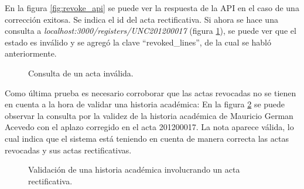 En la figura \ref{fig:revoke_api} se puede ver la respuesta de la API en el caso de una corrección exitosa. Se indica el id del acta rectificativa. Si ahora se hace una consulta a \textit{localhost:3000/registers/UNC201200017} (figura \ref{fig:invalid_register}), se puede ver que el estado es inválido y se agregó la clave ``revoked\_lines'', de la cual se habló anteriormente.
\begin{figure}
    \caption{Consulta de un acta inválida.}
    \label{fig:invalid_register}
\end{figure}

Como última prueba es necesario corroborar que las actas revocadas no se tienen en cuenta a la hora de validar una historia académica: En la figura \ref{fig:history_with_revoked} se puede observar la consulta por la validez de la historia académica de Mauricio German Acevedo con el aplazo corregido en el acta 201200017. La nota aparece válida, lo cual indica que el sistema está teniendo en cuenta de manera correcta las actas revocadas y sus actas rectificativas.

\begin{figure}[H]
    \caption{Validación de una historia académica involucrando un acta rectificativa.}
    \label{fig:history_with_revoked}
\end{figure}
